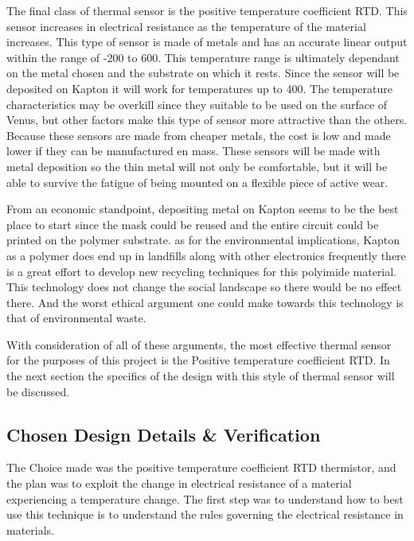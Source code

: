 \documentclass[12pt,a4paper]{report}
\begin{document}
The final class of thermal sensor is the positive temperature coefficient RTD. This sensor increases in electrical resistance as the temperature of the material increases. This type of sensor is made of metals and has an accurate linear output within the range of -200\textcelsius{} to 600\textcelsius{}. This temperature range is ultimately dependant on the metal chosen and the substrate on which it rests. Since the sensor will be deposited on Kapton it will work for temperatures up to 400\textcelsius{}. The temperature characteristics may be overkill since they suitable to be used on the surface of Venus, but other factors make this type of sensor more attractive than the others. Because these sensors are made from cheaper metals, the cost is low and made lower if they can be manufactured en mass. These sensors will be made with metal deposition so the thin metal will not only be comfortable, but it will be able to survive the fatigue of being mounted on a flexible piece of active wear.\par

From an economic standpoint, depositing metal on Kapton seems to be the best place to start since the mask could be reused and the entire circuit could be printed on the polymer substrate. as for the environmental implications, Kapton as a polymer does end up in landfills along with other electronics frequently there is a great effort to develop new recycling techniques for this polyimide material. This technology does not change the social landscape so there would be no effect there. And the worst ethical argument one could make towards this technology is that of environmental waste.\par

With consideration of all of these arguments, the most effective thermal sensor for the purposes of this project is the Positive temperature coefficient RTD. In the next section the specifics of the design with this style of thermal sensor will be discussed.

   
\subsection{Chosen Design Details \& Verification}

The Choice made was the positive temperature coefficient RTD thermistor, and the plan was to exploit the change in electrical resistance of a material experiencing a temperature change. The first step was to understand how to best use this technique is to understand the rules governing the electrical resistance in materials.\par
\end{document}
